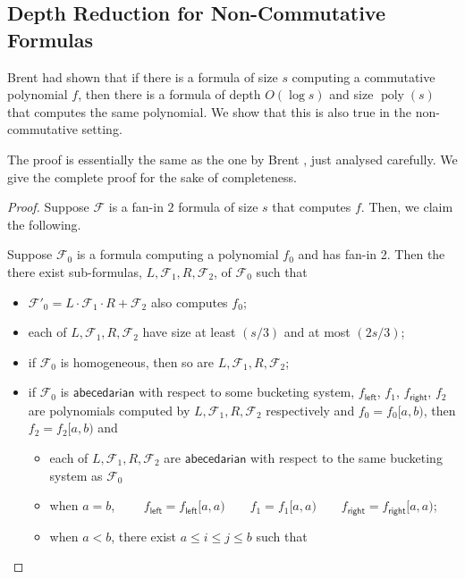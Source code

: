 \documentclass[10pt,a4paper]{article}
\def\poly{\operatorname{poly}}
\newcommand{\form}{\textbf{$\mathcal{F}$}}
\renewcommand{\l}{\mathsf{left}}
\renewcommand{\r}{\mathsf{right}}
\newcommand{\abcd}{\mathsf{abecedarian}}
\begin{document}
\subsection{Depth Reduction for Non-Commutative Formulas}\label{sec:depth-reduction}

Brent \cite{B74} had shown that if there is a formula of size $s$ computing a commutative polynomial $f$, then there is a formula of depth $O(\log s)$ and size $\poly(s)$ that computes the same polynomial. 
We show that this is also true in the non-commutative setting.

The proof is essentially the same as the one by Brent \cite{B74}, just analysed carefully.
We give the complete proof for the sake of completeness.

\depthReduction*

\begin{proof} 
	Suppose $\form$ is a fan-in $2$ formula of size $s$ that computes $f$. 
	Then, we claim the following.

\begin{claim}\label{clm:depth-reduction_induction-step}
	Suppose $\form_0$ is a formula computing a polynomial $f_0$ and has fan-in 2. 
	Then the there exist sub-formulas, $L, \form_1, R, \form_2$, of $\form_0$ such that
	\begin{itemize}
		\item $\form'_0 = L \cdot \form_1 \cdot R + \form_2$ also computes $f_0$;
		\item each of $L, \form_1, R, \form_2$ have size at least $(s/3)$ and at most $(2s/3)$;
		\item if $\form_0$ is homogeneous, then so are $L, \form_1, R, \form_2$;
		\item if $\form_0$ is $\abcd$ with respect to some bucketing system,  $f_\l$, $f_1$, $f_\r$, $f_2$ are polynomials computed by $L, \form_1, R, \form_2$ respectively and $f_0 = f_0[a,b)$, then $f_2 = f_2[a,b)$ and
		\begin{itemize}
			\item each of $L, \form_1, R, \form_2$ are $\abcd$ with respect to the same bucketing system as $\form_0$
			\item when $a = b$, $\qquad f_\l = f_\l[a,a) \qquad f_1 = f_1[a,a) \qquad f_\r = f_\r[a,a)$;
			\item when $a<b$, there exist $a \leq i \leq j \leq b$ such that
			

\end{itemize}
\end{itemize}
\end{claim}
\end{proof}
\end{document}
